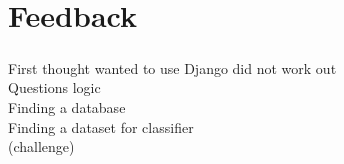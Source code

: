\chapter{Feedback} %

\paragraph{}
First thought wanted to use Django did not work out \\
Questions logic \\
Finding a database \\ 
Finding a dataset for classifier \\
(challenge) \\
